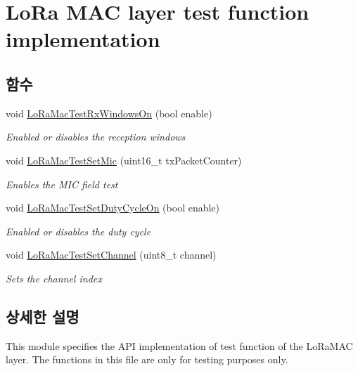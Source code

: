 \hypertarget{group___l_o_r_a_m_a_c_t_e_s_t}{}\section{Lo\+Ra M\+AC layer test function implementation}
\label{group___l_o_r_a_m_a_c_t_e_s_t}
\subsection*{함수}
\begin{DoxyCompactItemize}
\item 
void \mbox{\hyperlink{group___l_o_r_a_m_a_c_t_e_s_t_ga3e8dc79232b2c86d12d8b4191324283d}{Lo\+Ra\+Mac\+Test\+Rx\+Windows\+On}} (bool enable)
\begin{DoxyCompactList}\small\item\em Enabled or disables the reception windows \end{DoxyCompactList}\item 
void \mbox{\hyperlink{group___l_o_r_a_m_a_c_t_e_s_t_ga191314e00a8a27f426427473ba6821a7}{Lo\+Ra\+Mac\+Test\+Set\+Mic}} (uint16\+\_\+t tx\+Packet\+Counter)
\begin{DoxyCompactList}\small\item\em Enables the M\+IC field test \end{DoxyCompactList}\item 
void \mbox{\hyperlink{group___l_o_r_a_m_a_c_t_e_s_t_gacee5e0492e548af9e1ec5a995e460865}{Lo\+Ra\+Mac\+Test\+Set\+Duty\+Cycle\+On}} (bool enable)
\begin{DoxyCompactList}\small\item\em Enabled or disables the duty cycle \end{DoxyCompactList}\item 
void \mbox{\hyperlink{group___l_o_r_a_m_a_c_t_e_s_t_ga8cf3cc21ea237c5620536cea2750463e}{Lo\+Ra\+Mac\+Test\+Set\+Channel}} (uint8\+\_\+t channel)
\begin{DoxyCompactList}\small\item\em Sets the channel index \end{DoxyCompactList}\end{DoxyCompactItemize}


\subsection{상세한 설명}
This module specifies the A\+PI implementation of test function of the Lo\+Ra\+M\+AC layer. The functions in this file are only for testing purposes only. 

